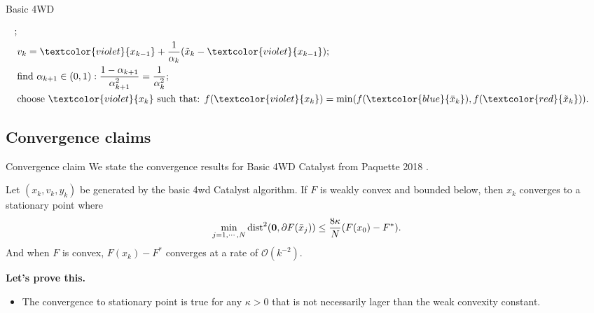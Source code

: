 \documentclass[11pt]{beamer}
\begin{document}
\begin{frame}{Basic 4WD}
\begin{definition}
{\begin{align*}
                    ;
                    \\
                    & v_{k} = \textcolor{violet}{x_{k - 1}} + \frac{1}{\alpha_k}(\tilde x_k - \textcolor{violet}{x_{k - 1}});
                    \\
                    & 
                    \text{find } \alpha_{k + 1} \in (0, 1): 
                    \frac{1 - \alpha_{k + 1}}{\alpha_{k + 1}^2} = \frac{1}{\alpha_k^2};
                    \\
                    & \text{choose } \textcolor{violet}{x_k} \text{ such that:  } 
                    f(\textcolor{violet}{x_k}) = \min(f(\textcolor{blue}{\bar x_k}), f(\textcolor{red}{\tilde x_k})). 
                \end{align*}
            }
            \end{definition}
        \end{frame}
    \subsection{Convergence claims}
        \begin{frame}{Convergence claim}
            We state the convergence results for Basic 4WD Catalyst from Paquette 2018 \cite{paquette_catalyst_2018}. 
            \begin{theorem}
                Let $(x_k, v_k, y_k)$ be generated by the basic 4wd Catalyst algorithm. 
                If $F$ is weakly convex and bounded below, then $x_k$ converges to a stationary point where
                \begin{align*}
                    \min_{j = 1, \cdots, N} \operatorname{dist}^2(\mathbf 0, \partial F(\bar x_j))
                    \le \frac{8 \kappa}{N}(F(x_0) - F^*). 
                \end{align*}
                And when $F$ is convex, $F(x_k) - F^*$ converges at a rate of $\mathcal O(k^{-2})$. 
            \end{theorem}
            \pause
            \textbf{Let's prove this.} 
            \begin{itemize}
                \item The convergence to stationary point is true for any $\kappa > 0$ that is not necessarily lager than the weak convexity constant. 
            \end{itemize}
        \end{frame}
\end{document}
